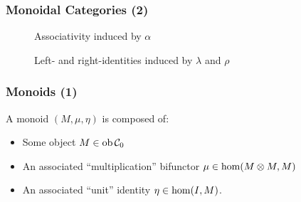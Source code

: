 \documentclass{beamer}
\numberwithin{figure}{section}
\begin{document}
\begin{frame}
        \frametitle{Monoidal Categories (2)}
        \begin{figure}
                \caption{Associativity induced by $\alpha$}
        \end{figure}

        \vfill
        \pause
        \begin{figure}
                \caption{Left- and right-identities induced by $\lambda$ and
                $\rho$}
        \end{figure}
\end{frame}

\begin{frame}
        \frametitle{Monoids (1)}
        A monoid $(M,\mu,\eta)$ is composed of:
        \begin{itemize}
                \item Some object $M \in \operatorname{ob} \mathcal{C}_0$
                \item An associated ``multiplication'' bifunctor $\mu \in
                        \operatorname{hom} (M \otimes M, M)$
                \item An associated ``unit'' identity $\eta \in \operatorname{hom} (I, M)$.
        \end{itemize}
\end{frame}
\end{document}
